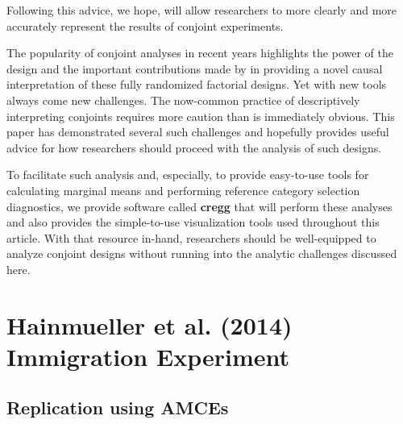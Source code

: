 \documentclass[a4paper,12pt]{article}\usepackage[]{graphicx}\usepackage[]{color}
\begin{document}
\noindent Following this advice, we hope, will allow researchers to more clearly and more accurately represent the results of conjoint experiments.

The popularity of conjoint analyses in recent years highlights the power of the design and the important contributions made by \citet{HainmuellerHopkinsYamamoto2014} in providing a novel causal interpretation of these fully randomized factorial designs. Yet with new tools always come new challenges. The now-common practice of descriptively interpreting conjoints requires more caution than is immediately obvious. This paper has demonstrated several such challenges and hopefully provides useful advice for how researchers should proceed with the analysis of such designs.

To facilitate such analysis and, especially, to provide easy-to-use tools for calculating marginal means and performing reference category selection diagnostics, we provide software called \textbf{cregg} \citep{Leeper2018cregg} that will perform these analyses and also provides the simple-to-use visualization tools used throughout this article. With that resource in-hand, researchers should be well-equipped to analyze conjoint designs without running into the analytic challenges discussed here.



\singlespacing


\clearpage

\appendix

\section{Hainmueller et al. (2014) Immigration Experiment}

\subsection{Replication using AMCEs}
\end{document}
